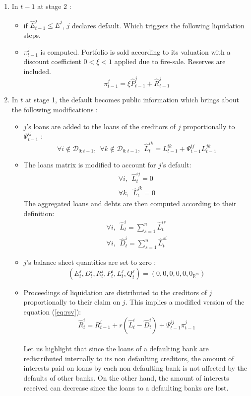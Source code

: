 \documentclass{article}
\newcommand{\wh}{\widehat}
\begin{document}
\begin{enumerate}

    \item In $t-1$ at stage 2 :
    \begin{itemize}
        \item if $\widehat{E}_{t-1}^j \leq \bar{E}^j$, $j$ declares default. Which triggers the following liquidation steps.
        \item $\pi_{t-1}^j$ is computed. Portfolio is sold according to its valuation with a discount coefficient $0 < \xi < 1$ applied due to fire-sale. Reserves are included. $$\pi_{t-1}^j = \xi \widehat{P}_{t-1}^j + \widehat{R}_{t-1}^j$$
    \end{itemize}
    \item In $t$ at stage 1, the default becomes public information which brings about the following modifications : 
    \begin{itemize}
        \item $j$'s loans are added to the loans of the creditors of $j$ proportionally to $\Psi_{t-1}^{ij}$ :
        $$\forall i \notin \mathcal{D}_{0:t-1},~~\forall k \notin \mathcal{D}_{0:t-1},  ~~ \wh L_t^{ik} = L_{t-1}^{ik} + \Psi_{t-1}^{ij} L_{t-1}^{jk}$$
        \item The loans matrix is modified to account for $j$'s default:
        \begin{eqnarray*}
        \forall i,~~ \wh L_t^{ij} = 0 \\
        \forall k,~~ \wh L_t^{jk} = 0
        \end{eqnarray*}
        The aggregated loans and debts are then computed according to their definition:
        \begin{eqnarray*}
        \forall i,~~ \wh L_t^i = \sum_{s=1}^n \wh L_t^{is} \\
        \forall i,~~ \wh D_t^i = \sum_{s=1}^n \wh L_t^{si}
        \end{eqnarray*}
        \item $j$'s balance sheet quantities are set to zero :
        $$(E_t^j, D_t^j, R_t^j, P_t^j, L_t^j, Q_t^j) = (0, 0, 0, 0, 0, 0_{\mathbb{R}^m}) $$
        \item Proceedings of liquidation are distributed to the creditors of $j$ proportionally to their claim on $j$. This implies a modified version of the equation (\ref{eq:rsv}): 
        $$ \widehat{R}_t^i = R_{t-1}^i + r (\wh L_t^i - \wh D_t^i) + \Psi_{t-1}^{ij} \pi_{t-1}^j$$

\paragraph{}
Let us highlight that since the loans of a defaulting bank are redistributed internally to its non defaulting creditors, the amount of interests paid on loans by each non defaulting bank is not affected by the defaults of other banks. On the other hand, the amount of interests received can decrease since the loans to a defaulting banks are lost. 

    \end{itemize}

 \end{enumerate}
 
\end{document}
